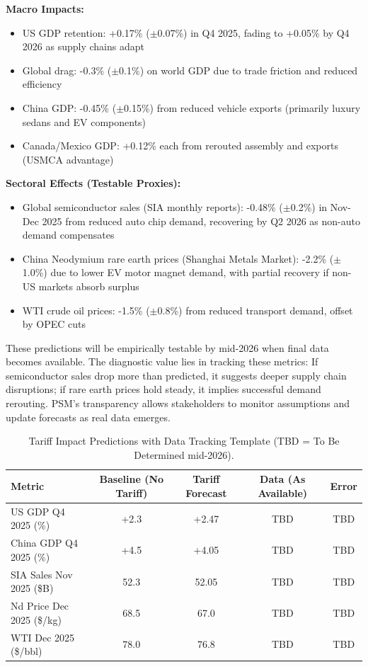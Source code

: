 \documentclass[11pt]{article}
\begin{document}
\textbf{Macro Impacts:}
\begin{itemize}
\item US GDP retention: +0.17\% ($\pm$0.07\%) in Q4 2025, fading to +0.05\% by Q4 2026 as supply chains adapt
\item Global drag: -0.3\% ($\pm$0.1\%) on world GDP due to trade friction and reduced efficiency
\item China GDP: -0.45\% ($\pm$0.15\%) from reduced vehicle exports (primarily luxury sedans and EV components)
\item Canada/Mexico GDP: +0.12\% each from rerouted assembly and exports (USMCA advantage)
\end{itemize}

\textbf{Sectoral Effects (Testable Proxies):}
\begin{itemize}
\item Global semiconductor sales (SIA monthly reports): -0.48\% ($\pm$0.2\%) in Nov-Dec 2025 from reduced auto chip demand, recovering by Q2 2026 as non-auto demand compensates
\item China Neodymium rare earth prices (Shanghai Metals Market): -2.2\% ($\pm$1.0\%) due to lower EV motor magnet demand, with partial recovery if non-US markets absorb surplus
\item WTI crude oil prices: -1.5\% ($\pm$0.8\%) from reduced transport demand, offset by OPEC cuts
\end{itemize}

These predictions will be empirically testable by mid-2026 when final data becomes available. The diagnostic value lies in tracking these metrics: If semiconductor sales drop more than predicted, it suggests deeper supply chain disruptions; if rare earth prices hold steady, it implies successful demand rerouting. PSM's transparency allows stakeholders to monitor assumptions and update forecasts as real data emerges.

\begin{table}[h]
\centering
\footnotesize
\begin{tabular}{lcccc}
\toprule
Metric & Baseline (No Tariff) & Tariff Forecast & Data (As Available) & Error \\
\midrule
US GDP Q4 2025 (\%) & +2.3 & +2.47 & TBD & TBD \\
China GDP Q4 2025 (\%) & +4.5 & +4.05 & TBD & TBD \\
SIA Sales Nov 2025 (\$B) & 52.3 & 52.05 & TBD & TBD \\
Nd Price Dec 2025 (\$/kg) & 68.5 & 67.0 & TBD & TBD \\
WTI Dec 2025 (\$/bbl) & 78.0 & 76.8 & TBD & TBD \\
\bottomrule
\end{tabular}
\caption{Tariff Impact Predictions with Data Tracking Template (TBD = To Be Determined mid-2026).}
\label{tab:tariff}
\end{table}
\end{document}
